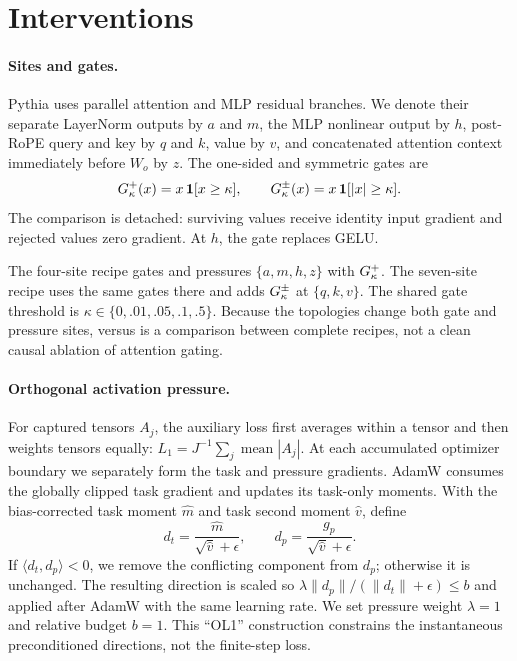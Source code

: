 \section{Interventions}
\label{sec:interventions}

\paragraph{Sites and gates.}
Pythia uses parallel attention and MLP residual branches.  We denote their
separate LayerNorm outputs by $a$ and $m$, the MLP nonlinear output by $h$,
post-RoPE query and key by $q$ and $k$, value by $v$, and concatenated attention
context immediately before $W_o$ by $z$.  The one-sided and symmetric gates are
\begin{equation}
 G^{+}_{\kappa}(x)=x\,\mathbf{1}[x\geq\kappa],\qquad
 G^{\pm}_{\kappa}(x)=x\,\mathbf{1}[|x|\geq\kappa].
 \label{eq:gates}
\end{equation}
The comparison is detached: surviving values receive identity input gradient
and rejected values zero gradient.  At $h$, the gate replaces GELU.

The four-site recipe \Afour{} gates and pressures $\{a,m,h,z\}$ with $G^{+}_{\kappa}$.
The seven-site recipe \Aseven{} uses the same gates there and adds $G^{\pm}_{\kappa}$ at
$\{q,k,v\}$.  The shared gate threshold is
$\kappa\in\{0,.01,.05,.1,.5\}$.  Because the topologies change both gate and
pressure sites, \Afour{} versus \Aseven{} is a comparison between complete
recipes, not a clean causal ablation of attention gating.

\paragraph{Orthogonal activation pressure.}
For captured tensors $A_j$, the auxiliary loss first averages within a tensor
and then weights tensors equally:
$L_1=J^{-1}\sum_j\operatorname{mean}|A_j|$.  At each accumulated optimizer
boundary we separately form the task and pressure gradients.  AdamW consumes
the globally clipped task gradient and updates its task-only moments.  With the
bias-corrected task moment $\hat m$ and task second moment $\hat v$, define
\begin{equation}
 d_t=\frac{\hat m}{\sqrt{\hat v}+\epsilon},\qquad
 d_p=\frac{g_p}{\sqrt{\hat v}+\epsilon}.
\end{equation}
If $\langle d_t,d_p\rangle<0$, we remove the conflicting component from $d_p$;
otherwise it is unchanged.  The resulting direction is scaled so
$\lambda\|d_p\|/(\|d_t\|+\epsilon)\leq b$ and applied after AdamW with the same
learning rate.  We set pressure weight $\lambda=1$ and relative budget $b=1$.
This ``OL1'' construction constrains the instantaneous preconditioned
directions, not the finite-step loss.

